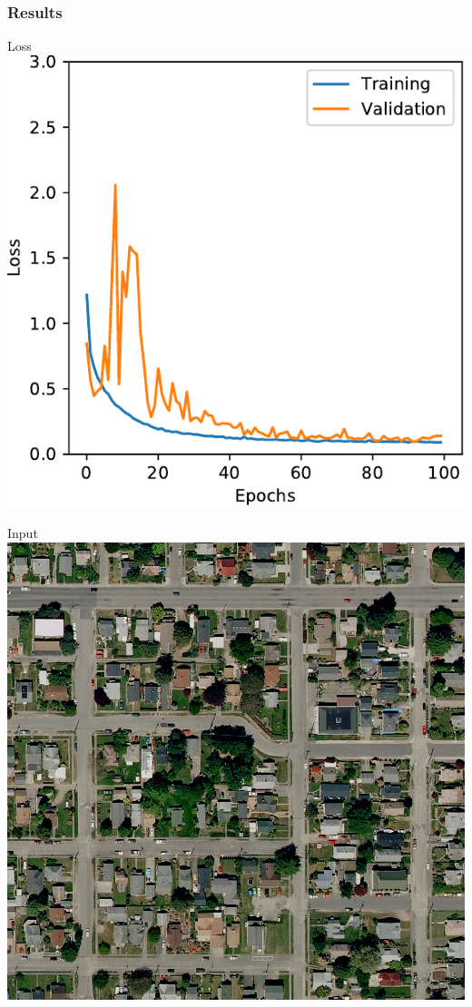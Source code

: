 \documentclass[usenames,dvipsnames,10pt]{beamer}
\begin{document}
\begin{frame}
\frametitle{Results}
\begin{minipage}[]{0.3\textwidth}
\centering
Loss
\includegraphics[width=\textwidth]{graphics/loss01.pdf}
\end{minipage}
\hspace{0.25cm}
\begin{minipage}[]{0.3\textwidth}
\centering
Input
\includegraphics[width=\textwidth]{graphics/aerial01.jpg}

\end{minipage}
\end{frame}
\end{document}
